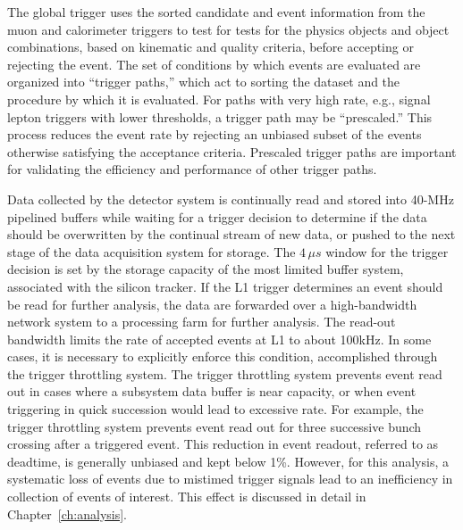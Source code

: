 The global trigger uses the sorted candidate and event information from
the muon and calorimeter triggers to test for
tests for the physics objects and object combinations,
based on kinematic and quality criteria, before accepting or rejecting
the event. The set of conditions by which events are evaluated
are organized into ``trigger paths,'' which act to sorting the 
dataset and the procedure by which it is evaluated. For paths 
with very high rate, e.g., signal lepton triggers with lower \pt
thresholds, a trigger path may be ``prescaled.'' This process 
reduces the event rate by rejecting an unbiased subset of the events
otherwise satisfying the acceptance criteria. Prescaled trigger paths
are important for validating the efficiency and performance of other
trigger paths.

Data collected by the detector system is continually read and stored into
40-MHz pipelined buffers while waiting for a trigger decision to determine
if the data should be overwritten by the continual stream of new data,
or pushed to the next stage of the data acquisition system for storage.
The $4\,\mu s$ window for the trigger decision is set by the storage capacity
of the most limited buffer system, associated with the silicon tracker.
If the L1 trigger determines an event should be read for further analysis,
the data are forwarded over a high-bandwidth network system to a 
processing farm for further analysis. The read-out bandwidth limits the 
rate of accepted events at L1 to about 100\unit{kHz}. In some cases, it is
necessary to explicitly enforce this condition, accomplished through
the trigger throttling system. The trigger throttling system prevents event
read out in cases where a subsystem data buffer is near capacity,
or when event triggering in quick succession would lead to excessive rate. For example,
the trigger throttling system prevents event read out for three successive
bunch crossing after a triggered event. This reduction in event readout,
referred to as deadtime, is generally unbiased and kept below 1\%. However,
for this analysis, a systematic loss of events due to mistimed
trigger signals lead to an inefficiency in collection of events of interest. This
effect is discussed in detail in Chapter~\ref{ch:analysis}.

